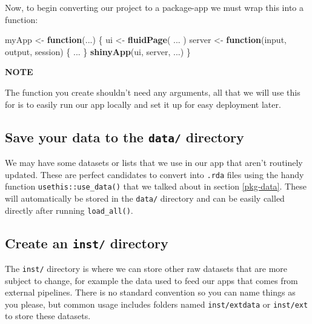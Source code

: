 \documentclass[
]{book}
\newenvironment{Shaded}{\begin{snugshade}}{\end{snugshade}}
\newcommand{\ControlFlowTok}[1]{\textcolor[rgb]{0.13,0.29,0.53}{\textbf{#1}}}
\newcommand{\KeywordTok}[1]{\textcolor[rgb]{0.13,0.29,0.53}{\textbf{#1}}}
\newcommand{\NormalTok}[1]{#1}
\newcommand{\StringTok}[1]{\textcolor[rgb]{0.31,0.60,0.02}{#1}}
\begin{document}
Now, to begin converting our project to a package-app we must wrap this into a function:

\begin{Shaded}
\begin{Highlighting}[]
\NormalTok{myApp <-}\StringTok{ }\ControlFlowTok{function}\NormalTok{(...) \{}
\NormalTok{  ui <-}\StringTok{ }\KeywordTok{fluidPage}\NormalTok{(}
\NormalTok{    ...}
\NormalTok{  )}
\NormalTok{  server <-}\StringTok{ }\ControlFlowTok{function}\NormalTok{(input, output, session) \{}
\NormalTok{    ...}
\NormalTok{  \}}
  \KeywordTok{shinyApp}\NormalTok{(ui, server, ...)}
\NormalTok{\}}
\end{Highlighting}
\end{Shaded}

\textbf{NOTE}

The function you create shouldn't need any arguments, all that we will use this for is to easily run our app locally and set it up for easy deployment later.

\hypertarget{save-your-data-to-the-data-directory}{%
\subsection{\texorpdfstring{Save your data to the \texttt{data/} directory}{Save your data to the data/ directory}}\label{save-your-data-to-the-data-directory}}

We may have some datasets or lists that we use in our app that aren't routinely updated. These are perfect candidates to convert into \texttt{.rda} files using the handy function \texttt{usethis::use\_data()} that we talked about in section \ref{pkg-data}. These will automatically be stored in the \texttt{data/} directory and can be easily called directly after running \texttt{load\_all()}.

\hypertarget{create-an-inst-directory}{%
\subsection{\texorpdfstring{Create an \texttt{inst/} directory}{Create an inst/ directory}}\label{create-an-inst-directory}}

The \texttt{inst/} directory is where we can store other raw datasets that are more subject to change, for example the data used to feed our apps that comes from external pipelines. There is no standard convention so you can name things as you please, but common usage includes folders named \texttt{inst/extdata} or \texttt{inst/ext} to store these datasets.
\end{document}
